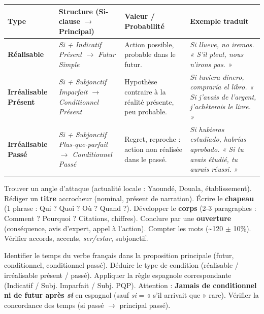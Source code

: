 \documentclass[11pt]{article}
\newcounter{popsec}
\newcounter{popsub}
\newcommand{\courssub}[1]{%
  \stepcounter{popsub}%
  \par\vspace{9pt}\noindent{\popxbold\fontsize{11.5}{13}\selectfont\color{popink}{\color{poporange}\thepopsec.\thepopsub}\hspace{6pt}#1}\par\nopagebreak\vspace{4pt}
}
\newcommand{\esp}[1]{\ifmmode\text{\textit{#1}}\else\begingroup\selectlanguage{spanish}\itshape #1\endgroup\fi}
\begin{document}
\begin{center}
\begin{tabularx}{\linewidth}{|>{\bfseries}X|X|X|X|}
\hline
\rowcolor{popblueL}
\textbf{Type} & \textbf{Structure (Si-clause $\rightarrow$ Principal)} & \textbf{Valeur / Probabilité} & \textbf{Exemple traduit} \\
\hline
\textbf{Réalisable} & \esp{Si + Indicatif Présent $\rightarrow$ Futur Simple} & Action possible, probable dans le futur. & \esp{Si llueve, no iremos.} « S'il pleut, nous n'irons pas. » \\
\hline
\textbf{Irréalisable Présent} & \esp{Si + Subjonctif Imparfait $\rightarrow$ Conditionnel Présent} & Hypothèse contraire à la réalité présente, peu probable. & \esp{Si tuviera dinero, compraría el libro.} « Si j'avais de l'argent, j'achèterais le livre. » \\
\hline
\textbf{Irréalisable Passé} & \esp{Si + Subjonctif Plus-que-parfait $\rightarrow$ Conditionnel Passé} & Regret, reproche : action non réalisée dans le passé. & \esp{Si hubieras estudiado, habrías aprobado.} « Si tu avais étudié, tu aurais réussi. » \\
\hline
\end{tabularx}
\end{center}

\courssub{Méthodes express}

\begin{methode}
Trouver un angle d'attaque (actualité locale : Yaoundé, Douala, établissement).
Rédiger un \textbf{titre} accrocheur (nominal, présent de narration).
Écrire le \textbf{chapeau} (1 phrase : Qui ? Quoi ? Où ? Quand ?).
Développer le \textbf{corps} (2-3 paragraphes : Comment ? Pourquoi ? Citations, chiffres).
Conclure par une \textbf{ouverture} (conséquence, avis d'expert, appel à l'action).
Compter les mots (\textasciitilde 120 $\pm$ 10\%). Vérifier accords, accents, \emph{ser/estar}, subjonctif.
\end{methode}

\begin{methode}
Identifier le temps du verbe français dans la proposition principale (futur, conditionnel, conditionnel passé).
Déduire le type de condition (réalisable / irréalisable présent / passé).
Appliquer la règle espagnole correspondante (Indicatif / Subj. Imparfait / Subj. PQP).
Attention : \textbf{Jamais de conditionnel ni de futur après \emph{si}} en espagnol (sauf \emph{si} = « s'il arrivait que » rare).
Vérifier la concordance des temps (si passé $\rightarrow$ principal passé).
\end{methode}
\end{document}

